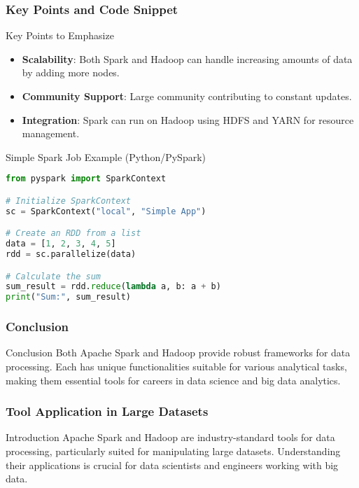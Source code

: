 \documentclass[aspectratio=169]{beamer}
\begin{document}
\begin{frame}[fragile]
    \frametitle{Key Points and Code Snippet}
    \begin{block}{Key Points to Emphasize}
        \begin{itemize}
            \item \textbf{Scalability}: Both Spark and Hadoop can handle increasing amounts of data by adding more nodes.
            \item \textbf{Community Support}: Large community contributing to constant updates.
            \item \textbf{Integration}: Spark can run on Hadoop using HDFS and YARN for resource management.
        \end{itemize}
    \end{block}

    \begin{block}{Simple Spark Job Example (Python/PySpark)}
    \begin{lstlisting}[language=Python]
from pyspark import SparkContext

# Initialize SparkContext
sc = SparkContext("local", "Simple App")

# Create an RDD from a list
data = [1, 2, 3, 4, 5]
rdd = sc.parallelize(data)

# Calculate the sum
sum_result = rdd.reduce(lambda a, b: a + b)
print("Sum:", sum_result)
    \end{lstlisting}
    \end{block}
\end{frame}

\begin{frame}[fragile]
    \frametitle{Conclusion}
    \begin{block}{Conclusion}
        Both Apache Spark and Hadoop provide robust frameworks for data processing. Each has unique functionalities suitable for various analytical tasks, making them essential tools for careers in data science and big data analytics.
    \end{block}
\end{frame}

\begin{frame}[fragile]
    \frametitle{Tool Application in Large Datasets}
    \begin{block}{Introduction}
        Apache Spark and Hadoop are industry-standard tools for data processing, particularly suited for manipulating large datasets. Understanding their applications is crucial for data scientists and engineers working with big data.
    \end{block}
\end{frame}
\end{document}
